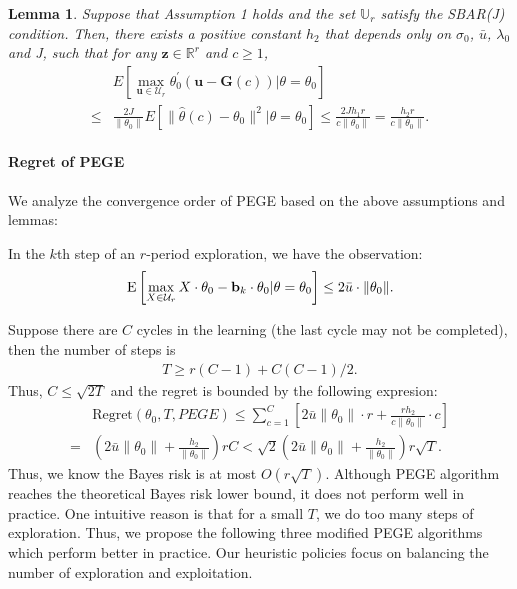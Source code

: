 \documentclass{article}
\newtheorem{lemma}[theorem]{Lemma}
\theoremstyle{plain}
\theoremstyle{definition}
\begin{document}
\begin{lemma}
Suppose that Assumption 1 holds and the set $\mathbb{U}_{r}$ satisfy the SBAR(J) condition. Then, there exists a positive constant $h_{2}$ that depends only on $\sigma_{0}$, $\bar{u}$, $\lambda_{0}$ and J, such that for any $\textbf{z}\in \mathbb{R}^{r}$ and $c\geq 1$,
\begin{align}
&E \left[ \max_{\textbf{u}\in \mathcal{U}_{r}} \theta_{0}^{'}(\textbf{u}-\textbf{G}(c))|\theta=\theta_{0}\right] \nonumber \\
\leq & \frac{2J}{\|\theta_0\|}E\left[\|\hat{\theta}(c)-\theta_{0}\|^{2}|\theta=\theta_{0}\right]\leq
\frac{2Jh_{1}r}{c\|\theta_{0}\|} =\frac{h_2r}{c\|\theta_0\|}.
\end{align}
\end{lemma}


\paragraph{Regret of PEGE}
We analyze the convergence order of PEGE based on the above assumptions and lemmas:

In the $k$th step of an $r$-period exploration, we have the observation:
\[\text{E}\left[\max_{X\in\mathcal{U}_r} X\cdot \theta_0 - \bold{b}_k\cdot\theta_0 | \theta = \theta_0\right]\leq 2\bar{u}\cdot\|\theta_0\|.\]


Suppose there are $C$ cycles in the learning (the last cycle may not be completed), then the number of steps is
\begin{align}
T \geq r(C-1) + {C(C-1)}/{2}.\label{TC:PEGE}
\end{align}
Thus, $C\leq \sqrt{2T}$ and the regret is bounded by the following expresion:
\begin{align}
&\text{Regret}(\theta_0, T, PEGE)\leq  \sum_{c=1}^{C}\left[2\bar{u}\|\theta_0\| \cdot r + \frac{rh_2}{c\|\theta_0\|}\cdot c\right] \nonumber\\
= & (2\bar{u}\|\theta_0\|+\frac{h_2}{\|\theta_0\|})rC
<  \sqrt{2}(2\bar{u}\|\theta_0\|+\frac{h_2}{\|\theta_0\|})r\sqrt{T}. \label{reg:PEGE}
\end{align}
Thus, we know the Bayes risk is at most $O(r\sqrt{T})$. Although PEGE algorithm reaches the theoretical Bayes risk lower bound, it does not perform well in practice. One intuitive reason is that for a small $T$, we do too many steps of exploration. Thus, we propose the following three modified PEGE algorithms which perform better in practice. Our heuristic policies focus on balancing the number of exploration and exploitation.
\end{document}
